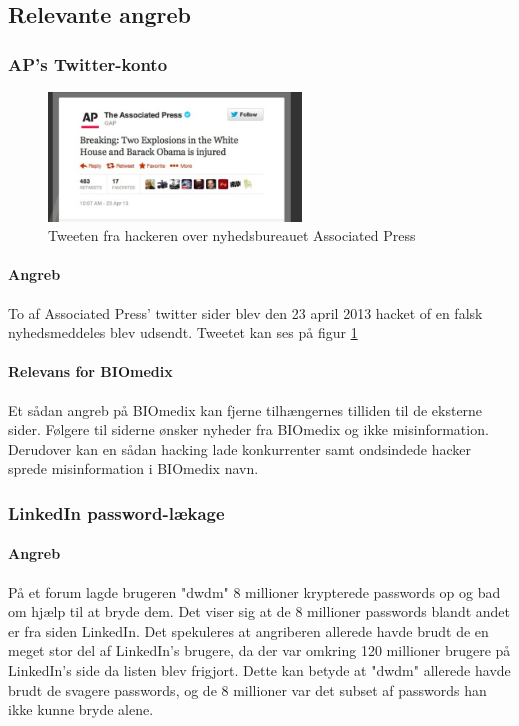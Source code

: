 \documentclass{article}
\begin{document}
\subsection{Relevante angreb}

\subsubsection{AP's Twitter-konto}

\begin{figure}
  \begin{center}
    \includegraphics[width=0.6\textwidth]{../Pictures/APTweet.jpg}
  \end{center}
  \caption{Tweeten fra hackeren over nyhedsbureauet Associated Press \cite{APTweetSource}}
  \label{fig:Tweet}
\end{figure}

\paragraph{Angreb}

To af Associated Press' twitter sider blev den 23 april 2013 hacket of en falsk nyhedsmeddeles blev udsendt\cite{TweetStory}. Tweetet kan ses på figur \ref{fig:Tweet}

\paragraph{Relevans for BIOmedix}

Et sådan angreb på BIOmedix kan fjerne tilhængernes tilliden til de eksterne sider. Følgere til siderne
ønsker nyheder fra BIOmedix og ikke misinformation. Derudover kan en sådan hacking lade konkurrenter
samt ondsindede hacker sprede misinformation i BIOmedix navn. 

\subsubsection{LinkedIn password-lækage}

\paragraph{Angreb}
På et forum lagde brugeren "dwdm" 8 millioner krypterede passwords op og bad om hjælp
til at bryde dem. Det viser sig at de 8 millioner passwords blandt andet er fra siden LinkedIn.
Det spekuleres at angriberen allerede havde brudt de en meget stor del af LinkedIn's brugere, da
der var omkring 120 millioner brugere på LinkedIn's side da listen blev frigjort. Dette kan betyde
at "dwdm" allerede havde brudt de svagere passwords, og de 8 millioner var det subset af passwords
han ikke kunne bryde alene\cite{LinkedInStory}.
\end{document}

